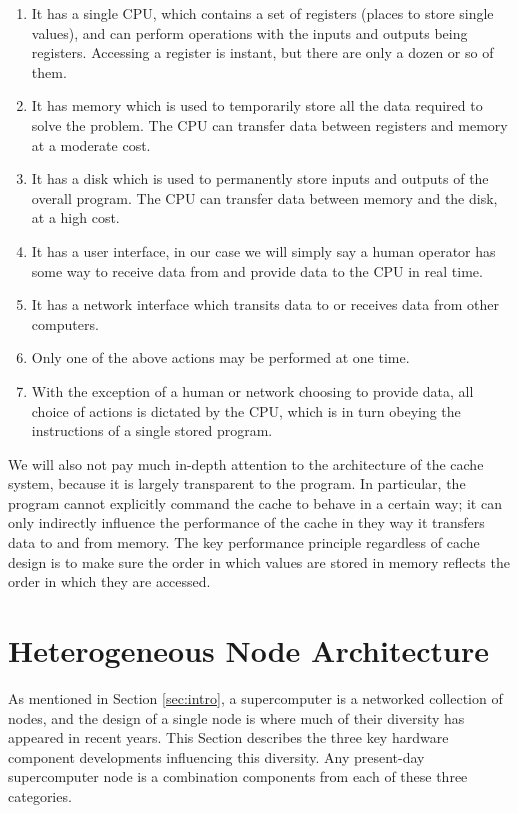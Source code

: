 \begin{enumerate}
\item It has a single CPU, which contains a set
of registers (places to store single values),
and can perform operations with the inputs
and outputs being registers.
Accessing a register is instant, but there are
only a dozen or so of them.
\item It has memory which is used to temporarily store
all the data required to solve the problem.
The CPU can transfer data between registers
and memory at a moderate cost.
\item It has a disk which is used to permanently store
inputs and outputs of the overall program.
The CPU can transfer data between memory
and the disk, at a high cost.
\item It has a user interface, in our case
we will simply say a human operator has
some way to receive data from and provide
data to the CPU in real time.
\item It has a network interface which transits
data to or receives data from other computers.
\item Only one of the above actions may be
performed at one time.
\item With the exception of a human or network choosing
to provide data, all choice of actions is
dictated by the CPU, which is in turn obeying
the instructions of a single stored program.
\end{enumerate}

We will also not pay much in-depth attention to the
architecture of the cache system, because it
is largely transparent to the program.
In particular, the program cannot explicitly
command the cache to behave in a certain way;
it can only indirectly influence the performance
of the cache in they way it transfers data to and
from memory.
The key performance principle regardless of cache design is
to make sure the order in which values are stored
in memory reflects the order in which they are accessed.

\section{Heterogeneous Node Architecture}

As mentioned in Section \ref{sec:intro}, a supercomputer is
a networked collection of nodes, and the design of a single node
is where much of their diversity has appeared in recent years.
This Section describes the three key hardware component developments
influencing this diversity.
Any present-day supercomputer node is a combination components
from each of these three categories.

